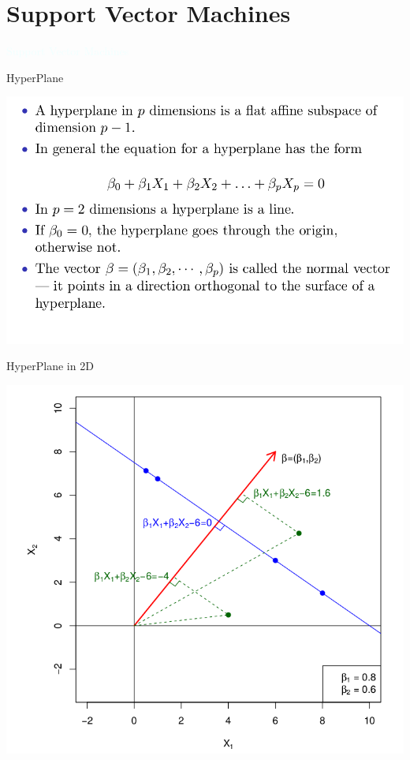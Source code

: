 \documentclass{beamer}
\newcommand{\thblue}[1]{{\Huge {\textcolor{azure}{#1}}}}
\begin{document}
\section{Support Vector Machines}
\begin{frame}{} 
    \begin{center}
        \thblue{Support Vector Machines}
    \end{center}
\end{frame}

\begin{frame}{HyperPlane}
    \begin{center}
        \includegraphics[scale=0.32]{hyerplane1.png}
    \end{center}
\end{frame}
\begin{frame}{HyperPlane in 2D}
    \begin{center}
        \includegraphics[scale=0.32]{hyerplane2.png}
    \end{center}
\end{frame}
\end{document}
